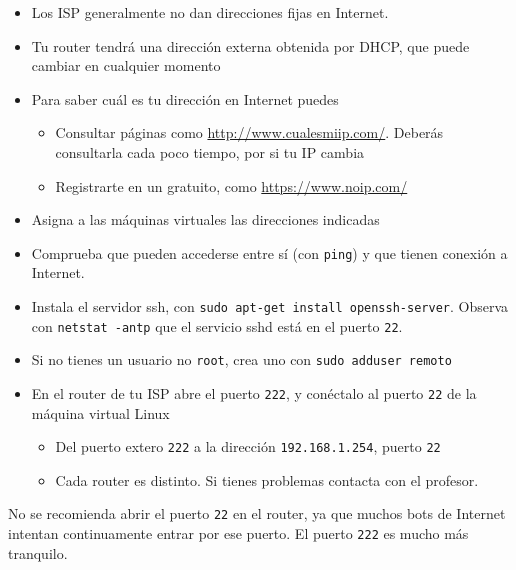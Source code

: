\begin{homeworkProblem}
  \begin{itemize}
  \item Los ISP generalmente no dan direcciones fijas en Internet.
  \item Tu router tendrá una dirección externa obtenida por DHCP, que puede cambiar en cualquier momento
  \item Para saber cuál es tu dirección en Internet puedes
    \begin{itemize}
    \item Consultar páginas como \url{http://www.cualesmiip.com/}. Deberás consultarla cada poco tiempo, por si tu IP cambia
    \item Registrarte en un  gratuito, como \url{https://www.noip.com/}
    \end{itemize}
  \end{itemize}
\end{homeworkProblem}

\begin{homeworkProblem}
  \begin{itemize}
  \item Asigna a las máquinas virtuales las direcciones indicadas
    
  \item Comprueba que pueden accederse entre sí (con \texttt{ping}) y que tienen conexión a Internet.
  \end{itemize}
\end{homeworkProblem}

\begin{homeworkProblem}
  \begin{itemize}
  \item Instala el servidor ssh, con \texttt{sudo apt-get install openssh-server}. Observa con \texttt{netstat -antp} que el servicio sshd está en el puerto \texttt{22}.
  \item Si no tienes un usuario no \texttt{root}, crea uno con \texttt{sudo adduser remoto}
  \item En el router de tu ISP abre el puerto \texttt{222}, y conéctalo al puerto \texttt{22} de la máquina virtual Linux
    \begin{itemize}
    \item Del puerto extero \texttt{222} a la dirección \texttt{192.168.1.254}, puerto \texttt{22}
    \item Cada router es distinto. Si tienes problemas contacta con el profesor.
    \end{itemize}
  \end{itemize}

  \begin{Aviso}
    No se recomienda abrir el puerto \texttt{22} en el router, ya que muchos bots de Internet intentan continuamente entrar por ese puerto. El puerto \texttt{222} es mucho más tranquilo. 
  \end{Aviso}
\end{homeworkProblem}


